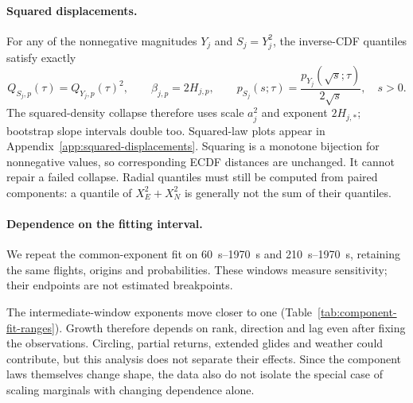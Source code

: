 \paragraph{Squared displacements.}
For any of the nonnegative magnitudes $Y_j$ and $S_j=Y_j^2$, the inverse-CDF
quantiles satisfy exactly
\begin{equation}
 Q_{S_j,p}(\tau)=Q_{Y_j,p}(\tau)^2,\qquad
 \beta_{j,p}=2H_{j,p},\qquad
 p_{S_j}(s;\tau)=\frac{p_{Y_j}(\sqrt{s};\tau)}{2\sqrt{s}},\quad s>0.
 \label{eq:squared-displacement-scaling}
\end{equation}
The squared-density collapse therefore uses scale $a_j^2$ and exponent $2H_{j,*}$;
bootstrap slope intervals double too. Squared-law plots appear in
Appendix~\ref{app:squared-displacements}. Squaring is a monotone bijection for
nonnegative values, so corresponding ECDF distances are unchanged. It cannot
repair a failed collapse. Radial quantiles must still be computed from paired
components: a quantile of $X_E^2+X_N^2$ is generally not the sum of their quantiles.

\paragraph{Dependence on the fitting interval.}
We repeat the common-exponent fit on \SIrange{60}{1970}{\second} and
\SIrange{210}{1970}{\second}, retaining the same flights, origins and probabilities.
These windows measure sensitivity; their endpoints are not estimated breakpoints.

\begin{table}[tb]
 \centering\small
 \caption{Common magnitude exponent $H_{j,*}$ fitted on three lag windows with
 identical observations and weights. The differences expose the cost of summarising
 curved quantile growth by a single power. All twelve separate slopes and their
 paired bootstrap contrasts for each window are retained in the numerical report.}
 \label{tab:component-fit-ranges}
 
\end{table}

The intermediate-window exponents move closer to one
(Table~\ref{tab:component-fit-ranges}). Growth therefore depends on rank, direction
and lag even after fixing the observations. Circling, partial returns, extended
glides and weather could contribute, but this analysis does not separate their effects.
Since the component laws themselves change shape, the data also do not isolate the
special case of scaling marginals with changing dependence alone.

